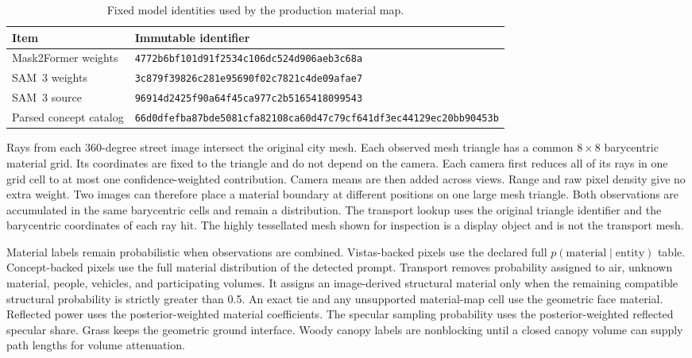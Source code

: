 \begin{table}[!t]
  \caption{Fixed model identities used by the production material map.}
  \label{tab:si-semantic-identity}
  \centering
  \scriptsize
  \begin{tabular}{lp{}}
    \toprule
    Item & Immutable identifier \\
    \midrule
    Mask2Former weights & \texttt{4772b6bf101d91f2534c106dc524d906aeb3c68a} \\
    SAM~3 weights & \texttt{3c879f39826c281e95690f02c7821c4de09afae7} \\
    SAM~3 source & \texttt{96914d2425f90a64f45ca977c2b5165418099543} \\
    Parsed concept catalog & \texttt{66d0dfefba87bde5081cfa82108ca60d47c79cf641df3ec44129ec20bb90453b} \\
    \bottomrule
  \end{tabular}
\end{table}

Rays from each 360-degree street image intersect the original city mesh. Each
observed mesh triangle has a common $8\times8$ barycentric material grid. Its
coordinates are fixed to the triangle and do not depend on the camera. Each
camera first reduces all of its rays in one grid cell to at most one
confidence-weighted contribution. Camera
means are then added across views. Range and raw pixel density give no extra
weight. Two images can therefore place a material boundary at different
positions on one large mesh triangle. Both observations are accumulated in
the same barycentric cells and remain a distribution. The transport lookup uses the
original triangle identifier and the barycentric coordinates of each ray hit.
The highly tessellated mesh shown for inspection is a display object and
is not the transport mesh.

Material labels remain probabilistic when observations are combined. Vistas-backed pixels
use the declared full $p(\text{material}\mid\text{entity})$ table. Concept-backed
pixels use the full material distribution of the detected prompt. Transport
removes probability assigned to air, unknown material, people, vehicles, and
participating volumes. It assigns an image-derived structural material only when
the remaining compatible structural probability is strictly greater than 0.5.
An exact tie and any unsupported material-map cell use the geometric face material.
Reflected power uses the posterior-weighted material coefficients. The
specular sampling probability uses the posterior-weighted reflected specular
share. Grass keeps the geometric ground interface. Woody canopy labels are
nonblocking until a closed canopy volume can supply path lengths for
volume attenuation.

